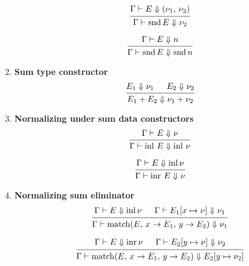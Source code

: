 \documentclass{article}
\begin{document}
\begin{enumerate}
  \[
    \begin{prooftree}
      \hypo{\Gamma \vdash E \Downarrow (\nu_1, \, \nu_2)}
      \infer1{\Gamma \vdash \snd E \Downarrow \nu_2}
    \end{prooftree}
  \]

  \[
   \begin{prooftree}
     \hypo{\Gamma \vdash E \Downarrow n}
     \infer1{\Gamma \vdash \snd E \Downarrow \snd n}
   \end{prooftree}
  \]


  \item \textbf{Sum type constructor}
  \[
    \begin{prooftree}
      \hypo{E_1 \Downarrow \nu_1}
      \hypo{E_2 \Downarrow \nu_2}
      \infer2{E_1 + E_2 \Downarrow \nu_1 + \nu_2}
    \end{prooftree}
  \]

  \item \textbf{Normalizing under sum data constructors}
  \[
    \begin{prooftree}
      \hypo{\Gamma \vdash E \Downarrow \nu}
      \infer1{\Gamma \vdash \inl \, E \Downarrow \inl \, \nu}
    \end{prooftree}  
  \]

  \[
    \begin{prooftree}
     \hypo{\Gamma \vdash E \Downarrow \inl \nu}
     \infer1{\Gamma \vdash \inr \, E \Downarrow \nu}
    \end{prooftree}  
  \]

  \item \textbf{Normalizing sum eliminator}
  \[
    \begin{prooftree}
      \hypo{\Gamma \vdash E \Downarrow \inl \nu}
      \hypo{\Gamma \vdash E_1[x \mapsto \nu] \Downarrow \nu_1}
      \infer2{\Gamma \vdash 
        \match(E, \, x \rightarrow E_1, \, y \rightarrow E_2)
        \Downarrow \nu_1}
    \end{prooftree}  
  \]

  \[
   \begin{prooftree}
     \hypo{\Gamma \vdash E \Downarrow \inr \nu}
     \hypo{\Gamma \vdash E_2[y \mapsto \nu] \Downarrow \nu_2}
     \infer2{\Gamma \vdash 
       \match(E, \, x \rightarrow E_1, \, y \rightarrow E_2)
       \Downarrow E_2[y \mapsto \nu_2]}
   \end{prooftree}  
  \]


\end{enumerate}
\end{document}
